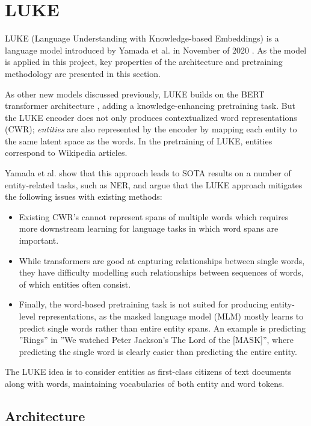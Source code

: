 \documentclass[main.tex]{subfiles}
\begin{document}
\section{LUKE}
\label{sec:LUKE}
LUKE (Language Understanding with Knowledge-based Embeddings) is a language model introduced by Yamada et al. in November of 2020 \cite{yamada2020luke}.
As the model is applied in this project, key properties of the architecture and pretraining methodology are presented in this section.

As other new models discussed previously, LUKE builds on the BERT transformer architecture \cite{devlin2019bert}, adding a knowledge-enhancing pretraining task.
But the LUKE encoder does not only produces contextualized word representations (CWR); 
\emph{entities} are also represented by the encoder by mapping each entity to the same latent space as the words.
In the pretraining of LUKE, entities correspond to Wikipedia articles.

Yamada et al. show that this approach leads to SOTA results on a number of entity-related tasks, such as NER, and argue that the LUKE approach mitigates the following issues with existing methods:
\begin{itemize}
    \item Existing CWR's cannot represent spans of multiple words which requires more downstream learning for language tasks in which word spans are important.
    \item While transformers are good at capturing relationships between single words, they have difficulty modelling such relationships between sequences of words, of which entities often consist.
    \item Finally, the word-based pretraining task is not suited for producing entity-level representations, as the masked language model (MLM) mostly learns to predict single words rather than entire entity spans.
        An example is predicting ''Rings'' in ''We watched Peter Jackson's The Lord of the [MASK]'', where predicting the single word is clearly easier than predicting the entire entity.
\end{itemize}
The LUKE idea is to consider entities as first-class citizens of text documents along with words, maintaining vocabularies of both entity and word tokens.
\subsection{Architecture}
\end{document}
